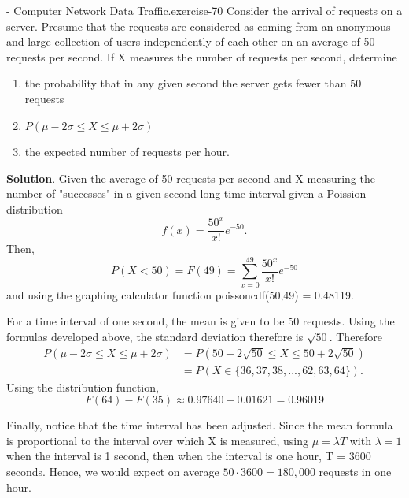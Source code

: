 \documentclass[10pt,]{book}
\numberwithin{equation}{section}
\newcommand{\lt}{<}
\begin{document}
%
\par
\hypertarget{p-1012}{}%
\begin{inlineexercise}{- Computer Network Data Traffic.}{exercise-70}%
\hypertarget{p-1013}{}%
Consider the arrival of requests on a server. Presume that the requests are considered as coming from an anonymous and large collection of users independently of each other on an average of 50 requests per second. If X measures the number of requests per second, determine \leavevmode%
\begin{enumerate}
\item\hypertarget{li-305}{}the probability that in any given second the server gets fewer than 50 requests%
\item\hypertarget{li-306}{}\(P(\mu - 2\sigma \le X \le \mu + 2\sigma)\)%
\item\hypertarget{li-307}{}the expected number of requests per hour.%
\end{enumerate}
 \textbf{Solution}.\quad%
\hypertarget{p-1014}{}%
Given the average of 50 requests per second and X measuring the number of "successes" in a given second long time interval given a Poission distribution%
\begin{equation*}
f(x) = \frac{50^x}{x!}e^{-50}.
\end{equation*}
Then,%
\begin{equation*}
P(X \lt 50) = F(49) = \sum_{x=0}^{49} \frac{50^x}{x!} e^{-50}
\end{equation*}
and using the graphing calculator function poissoncdf(50,49) = 0.48119.%
\par
\hypertarget{p-1015}{}%
For a time interval of one second, the mean is given to be 50 requests. Using the formulas developed above, the standard deviation therefore is \(\sqrt{50}\). Therefore%
\begin{align*}
P(\mu - 2\sigma \le X \le \mu + 2\sigma) & = P(50 - 2\sqrt{50} \le X \le 50 + 2\sqrt{50})\\
& = P(X \in \{ 36, 37, 38, ..., 62, 63, 64 \}).
\end{align*}
Using the distribution function,%
\begin{equation*}
F(64) - F(35) \approx 0.97640 - 0.01621 = 0.96019
\end{equation*}
%
\par
\hypertarget{p-1016}{}%
Finally, notice that the time interval has been adjusted. Since the mean formula is proportional to the interval over which X is measured, using \(\mu = \lambda T\) with \(\lambda = 1\) when the interval is 1 second, then when the interval is one hour, T = 3600 seconds. Hence, we would expect on average \(50 \cdot 3600 = 180,000\) requests in one hour.%
%
\end{inlineexercise}
%
%
%
\typeout{************************************************}
\typeout{************************************************}
%
\end{document}
